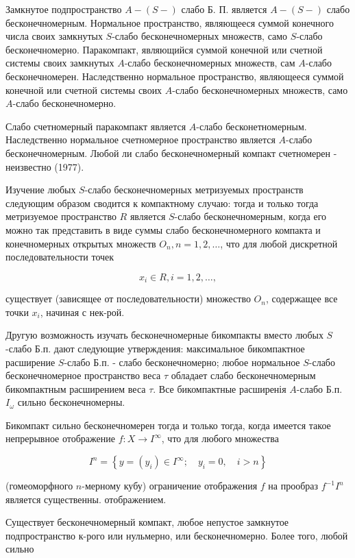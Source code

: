 \documentclass[10pt]{article}
\begin{document}
Замкнутое подпространство $A-(S-)$ слабо Б. П. является $A-(S-)$ слабо бесконечномерным. Нормальное пространство, являющееся суммой конечного числа своих замкнутых $S$-слабо бесконечномерных множеств, само $S$-слабо бесконечномерно. Паракомпакт, являющийся суммой конечной или счетной системы своих замкнутых $A$-слабо бесконечномерных множеств, сам $A$-слабо бесконечномерен. Наследственно нормальное пространство, являющееся суммой конечной или счетной системы своих $A$-слабо бесконечномерных множеств, само $A$-слабо бесконечномерно.



Слабо счетномерный паракомпакт является $A$-слабо бесконетномерным. Наследственно нормальное счетномерное пространство является $A$-слабо бесконечномерным. Любой ли слабо бесконечномерный компакт счетномерен - неизвестно (1977).



Изучение любых $S$-слабо бесконечномерных метризуемых пространств следующим образом сводится к компактному случаю: тогда и только тогда метризуемое пространство $R$ является $S$-слабо бесконечномерным, когда его можно так представить в виде суммы слабо бесконечномерного компакта и конечномерных открытых множеств $O_{n}, n=1,2, \ldots$, что для любой дискретной последовательности точек



\[

x_{i} \in R, i=1,2, \ldots,

\]



существует (зависящее от последовательности) множество $O_{n}$, содержащее все точки $x_{i}$, начиная с нек-рой.



Другую возможность изучать бесконечномерные бикомпакты вместо любых $S$-слабо Б.п. дают следующие утверждения: максимальное бикомпактное расширение $S$-слабо Б.п. - слабо бесконечномерно; любое нормальное $S$-слабо бесконечномерное пространство веса $\tau$ обладает слабо бесконечномерным бикомпактным расширением веса $\tau$. Все бикомпактные расширенія $A$-слабо Б.п. $I_{\omega}$ сильно бесконечномерны.



Бикомпакт сильно бесконечномерен тогда и только тогда, когда имеется такое непрерывное отображение $f: X \rightarrow I^{\infty}$, что для любого множества



\[

I^{n}=\left\{y=\left(y_{i}\right) \in I^{\infty} ; \quad y_{i}=0, \quad i>n\right\}

\]



(гомеоморфного $n$-мерному кубу) ограничение отображения $f$ на прообраз $f^{-1} I^{n}$ является существенны. отображением.



Существует бесконечномерный компакт, любое непустое замкнутое подпространство к-рого или нульмерно, или бесконечномерно. Более того, любой сильно
\end{document}
